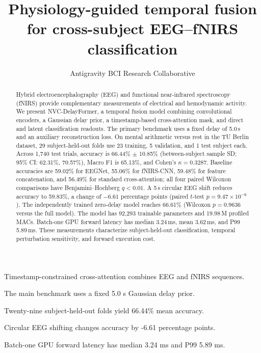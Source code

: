 \documentclass[final,5p,times,twocolumn]{elsarticle}
\begin{document}
\begin{frontmatter}

\title{Physiology-guided temporal fusion for cross-subject EEG--fNIRS classification}

\author[inst1]{Antigravity BCI Research Collaborative}


\begin{abstract}
Hybrid electroencephalography (EEG) and functional near-infrared spectroscopy (fNIRS) provide complementary measurements of electrical and hemodynamic activity. We present NVC-DelayFormer, a temporal fusion model combining convolutional encoders, a Gaussian delay prior, a timestamp-based cross-attention mask, and direct and latent classification readouts. The primary benchmark uses a fixed delay of 5.0\,s and an auxiliary reconstruction loss. On mental arithmetic versus rest in the TU Berlin dataset, 29 subject-held-out folds use 23 training, 5 validation, and 1 test subject each. Across 1,740 test trials, accuracy is 66.44\% $\pm$ 10.85\% (between-subject sample SD; 95\% CI: 62.31\%, 70.57\%), Macro F1 is 65.13\%, and Cohen's $\kappa=0.3287$. Baseline accuracies are 59.02\% for EEGNet, 55.06\% for fNIRS-CNN, 59.48\% for feature concatenation, and 56.49\% for standard cross-attention; all four paired Wilcoxon comparisons have Benjamini--Hochberg $q<0.01$. A 5\,s circular EEG shift reduces accuracy to 59.83\%, a change of $-6.61$ percentage points (paired $t$-test $p=9.47 \times 10^{-6}$). The independently trained zero-delay model reaches 66.61\% (Wilcoxon $p=0.9636$ versus the full model). The model has 92,293 trainable parameters and 19.98\,M profiled MACs. Batch-one GPU forward latency has median 3.24\,ms, mean 3.62\,ms, and P99 5.89\,ms. These measurements characterize subject-held-out classification, temporal perturbation sensitivity, and forward execution cost.
\end{abstract}

\begin{highlights}
\item Timestamp-constrained cross-attention combines EEG and fNIRS sequences.
\item The main benchmark uses a fixed 5.0 s Gaussian delay prior.
\item Twenty-nine subject-held-out folds yield 66.44\% mean accuracy.
\item Circular EEG shifting changes accuracy by -6.61 percentage points.
\item Batch-one GPU forward latency has median 3.24 ms and P99 5.89 ms.
\end{highlights}


\end{frontmatter}
\end{document}
